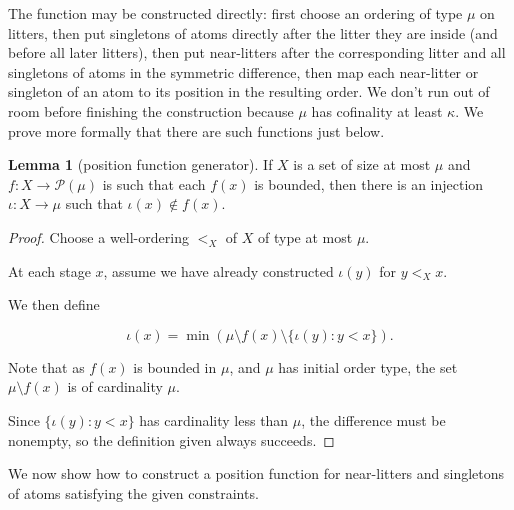 \documentclass{article}
\theoremstyle{definition}
\newtheorem{lemma}[theorem]{Lemma}
\theoremstyle{remark}
\begin{document}
The function may be constructed directly: first choose an ordering of type $\mu$ on litters, then put {singletons of} atoms directly after the litter they are inside (and before all later litters), then put near-litters after the corresponding litter and all {singletons of} atoms in the symmetric difference, then map each near-litter or {singleton of an} atom to its position in the resulting order.
We don't run out of room before finishing the construction because $\mu$ has cofinality at least $\kappa$.  We prove more formally that there are such functions just below.

\begin{lemma}[position function generator]\label{lem:position_generator}
If $X$ is a set of size at most $\mu$ and $f : X \to \mathcal P(\mu)$ is such that each $f(x)$ is bounded, then there is an injection $\iota : X \to \mu$ such that $\iota(x) \not\in f(x)$.
\end{lemma}

\begin{proof}

 Choose a well-ordering $<_X$ of
$X$ of type at most
$\mu$.

 At each stage $x$, assume we have already constructed
$\iota(y)$ for
$y <_X x$.

 We then define

 $$
\iota(x) = \min \left(\mu
\setminus f(x)
\setminus \{
\iota(y) : y < x \}\right). $$

 Note that as $f(x)$ is bounded in
$\mu$, and
$\mu$ has initial order type, the set
$\mu
\setminus f(x)$ is of cardinality
$\mu$.

 Since $\{
\iota(y) : y < x \}$ has cardinality less than
$\mu$, the difference must be nonempty, so the definition given always succeeds.

\end{proof}

We now show how to construct a position function for near-litters and singletons of atoms satisfying the given constraints.
\end{document}

